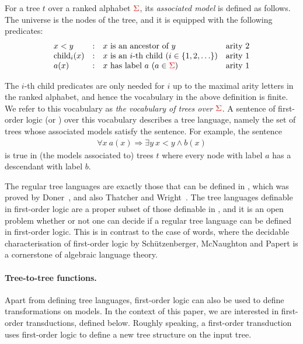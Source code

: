 \begin{definition}\label{def:tree-model}
   For a tree $t$  over a ranked alphabet ${\color{red}{\Sigma}}$, its \emph{associated model} 
    is defined as follows. The  universe is the nodes of the tree, and it is equipped with the following predicates:
   $$\begin{array}{lcll}
   x<y & : &   \text{$x$ is an ancestor of $y$} & \text{arity 2}\\
   \mathrm{child}_i(x) & : & \text{$x$ is an $i$-th child ($i\in \{1,2,\ldots\}$)} & \text{arity 1} \\
   a(x) & : &   \text{$x$ has label $a$ ($a \in {\color{red}{\Sigma}}$)} & \text{arity 1}
   \end{array}$$
    \end{definition}

The $i$-th child predicates are only needed for $i$ up to the maximal arity letters in the ranked alphabet, and hence the vocabulary in the above definition is finite. We refer to this vocabulary as \emph{the vocabulary of trees over ${\color{red}{\Sigma}}$}.
 A sentence of first-order logic (or  \mso)  over this vocabulary   describes a tree language, namely the set of trees whose associated models satisfy the sentence.  For example, the sentence 
 \begin{align*}
 \forall x \ a(x) \Rightarrow \exists y \ x < y \land b(x)
 \end{align*} 
 is true in (the models associated to)  trees $t$ where every node with label $a$ has a descendant with label $b$.
 
 The regular tree languages are exactly those that can be defined in \mso, which was proved by Doner~\cite[Corollary 3.11]{DBLP:journals/iandc/Schutzenberger65b}, and also Thatcher and Wright~\cite[p.~74]{thatcherGeneralizedFiniteAutomata1968}. The tree languages definable in first-order logic are a proper subset  of those definable in \mso, and it is an open problem whether or not one can decide if a regular tree language can be defined in first-order logic. This is in contrast to the case of words, where the decidable characterisation of  first-order logic by Sch\"utzenberger, McNaughton and Papert is  a cornerstone of algebraic language theory.
 
 \paragraph*{Tree-to-tree functions.}
 Apart from defining tree languages, first-order logic can also be used  to define transformations on  models. In the context of this paper, we are interested in first-order transductions, defined below.  Roughly speaking, a first-order transduction uses first-order logic to define a new tree structure on the input tree.

